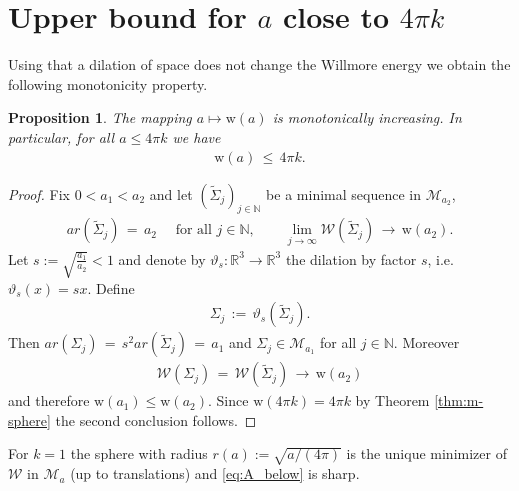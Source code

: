 \documentclass[reqno,makeidx,12pt]{amsart}
\theoremstyle{note}
\newtheorem{proposition}{Proposition}
\theoremstyle{definition}
\begin{document}
\section{Upper bound for $a$ close to $4\pi k$}
Using that a dilation of space does not change the Willmore energy we
obtain the following monotonicity property.
\begin{proposition}\label{prop:A_below}
The mapping $a\mapsto {\text{w}}(a)$ is monotonically increasing. In particular, for all $a\leq 4\pi k$ we have
\begin{gather}\label{eq:A_below}
  {\text{w}}(a)\,\leq\, 4\pi k.
\end{gather}
\end{proposition}
\begin{proof}
Fix $0<a_1<a_2$ and let $(\tilde{\Sigma}_j)_{j\in{\ensuremath{\mathbb{N}}}}$ be a minimal sequence in ${\mathcal{M}}_{a_2}$,
\begin{gather*}
  {ar}(\tilde{\Sigma}_j)\,=\, a_2 \quad\text{ for all }j\in{\ensuremath{\mathbb{N}}},\qquad
  \lim_{j\to\infty} {\mathcal{W}}(\tilde{\Sigma}_j)\,\to\, {\text{w}}(a_2).
\end{gather*}
Let $s:= \sqrt{\frac{a_1}{a_2}}<1$ and denote by $\vartheta_s:{\mathbb R}^3\to{\mathbb R}^3$ the
dilation by factor $s$, i.e. $\vartheta_s(x)=sx$. Define
\begin{gather*}
  \Sigma_j\,:=\, \vartheta_s(\tilde{\Sigma}_j).
\end{gather*}
Then ${ar}(\Sigma_j)\,=\, s^2{ar}(\tilde{\Sigma}_j)\,=\, a_1$ and $\Sigma_j\in{\mathcal{M}}_{a_1}$ for all $j\in{\ensuremath{\mathbb{N}}}$. Moreover
\begin{gather*}
  {\mathcal{W}}(\Sigma_j)\,=\,{\mathcal{W}}(\tilde{\Sigma}_j)\,\to\, {\text{w}}(a_2)
\end{gather*}
and therefore ${\text{w}}(a_1)\leq{\text{w}}(a_2)$. Since ${\text{w}}(4\pi k)=4\pi k$ by Theorem \ref{thm:m-sphere} the second conclusion follows.
\end{proof}
For $k=1$ the sphere with radius $r(a):=\sqrt{a/(4\pi)}$ is the unique
minimizer of ${\mathcal{W}}$ in ${\mathcal{M}}_a$ (up to translations) and \eqref{eq:A_below}
is sharp. 
\end{document}
